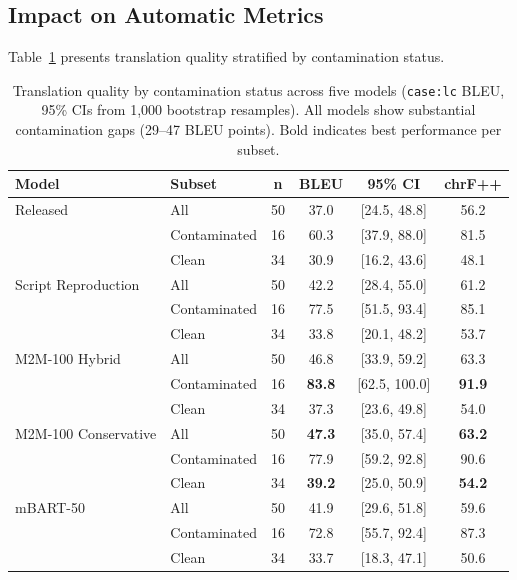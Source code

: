 \documentclass[11pt,a4paper]{article}
\begin{document}
\subsection{Impact on Automatic Metrics}
\label{sec:results-metrics}

Table~\ref{tab:main-results} presents translation quality stratified by contamination status.

\begin{table}[t]
\centering
\small
\begin{tabular}{@{}llcccc@{}}
\toprule
\textbf{Model} & \textbf{Subset} & \textbf{n} & \textbf{BLEU} & \textbf{95\% CI} & \textbf{chrF++} \\
\midrule
Released & All & 50 & 37.0 & {[}24.5, 48.8{]} & 56.2 \\
         & Contaminated & 16 & 60.3 & {[}37.9, 88.0{]} & 81.5 \\
         & Clean & 34 & 30.9 & {[}16.2, 43.6{]} & 48.1 \\
\addlinespace
Script Reproduction & All & 50 & 42.2 & {[}28.4, 55.0{]} & 61.2 \\
               & Contaminated & 16 & 77.5 & {[}51.5, 93.4{]} & 85.1 \\
               & Clean & 34 & 33.8 & {[}20.1, 48.2{]} & 53.7 \\
\addlinespace
M2M-100 Hybrid & All & 50 & 46.8 & {[}33.9, 59.2{]} & 63.3 \\
               & Contaminated & 16 & \textbf{83.8} & {[}62.5, 100.0{]} & \textbf{91.9} \\
               & Clean & 34 & 37.3 & {[}23.6, 49.8{]} & 54.0 \\
\addlinespace
M2M-100 Conservative & All & 50 & \textbf{47.3} & {[}35.0, 57.4{]} & \textbf{63.2} \\
                & Contaminated & 16 & 77.9 & {[}59.2, 92.8{]} & 90.6 \\
                & Clean & 34 & \textbf{39.2} & {[}25.0, 50.9{]} & \textbf{54.2} \\
\addlinespace
mBART-50 & All & 50 & 41.9 & {[}29.6, 51.8{]} & 59.6 \\
         & Contaminated & 16 & 72.8 & {[}55.7, 92.4{]} & 87.3 \\
         & Clean & 34 & 33.7 & {[}18.3, 47.1{]} & 50.6 \\
\bottomrule
\end{tabular}
\caption{Translation quality by contamination status across five models (\texttt{case:lc} BLEU, 95\% CIs from 1{,}000 bootstrap resamples). All models show substantial contamination gaps (29--47 BLEU points). Bold indicates best performance per subset.}
\label{tab:main-results}
\end{table}
\end{document}
